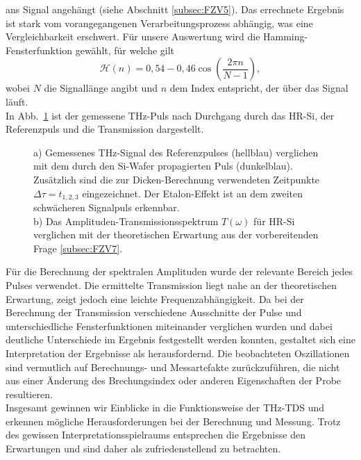 ans Signal angehängt (siehe Abschnitt \ref{subsec:FZV5}). 
Das errechnete Ergebnis ist stark vom vorangegangenen Verarbeitungsprozess abhängig, was eine 
Vergleichbarkeit erschwert. Für unsere Auswertung wird die Hamming-Fensterfunktion gewählt, für 
welche gilt \cite{Wiki}
\begin{equation}
    \mathcal{H}(n) = 0,54-0,46\cos(\frac{2\pi n}{N-1}),
\end{equation}
wobei $N$ die Signallänge angibt und $n$ dem Index entspricht, der über das Signal läuft. \\
In Abb.~\ref{fig:HR} ist der gemessene THz-Puls nach Durchgang durch das HR-Si, der Referenzpuls 
und die Transmission dargestellt.
\begin{figure}[h!]
    \centering
    \qquad
    \caption{\label{fig:HR}a) Gemessenes THz-Signal des Referenzpulses (hellblau) verglichen 
    mit dem durch den Si-Wafer propagierten Puls (dunkelblau). Zusätzlich sind die zur Dicken-Berechnung verwendeten
    Zeitpunkte $\Delta \tau = t_{1,2,3}$ eingezeichnet. Der Etalon-Effekt ist an dem zweiten 
    schwächeren Signalpuls erkennbar. \\
    b) Das Amplituden-Transmissionsspektrum $T(\omega)$ für HR-Si verglichen mit der theoretischen Erwartung 
    aus der vorbereitenden Frage \ref{subsec:FZV7}.}
\end{figure}\FloatBarrier
Für die Berechnung der spektralen Amplituden wurde der relevante Bereich jedes Pulses verwendet. 
Die ermittelte Transmission liegt nahe an der theoretischen Erwartung, zeigt jedoch eine leichte 
Frequenzabhängigkeit. Da bei der Berechnung der Transmission verschiedene Ausschnitte der Pulse 
und unterschiedliche Fensterfunktionen miteinander verglichen wurden und dabei deutliche 
Unterschiede im Ergebnis festgestellt werden konnten, gestaltet sich eine Interpretation der 
Ergebnisse als herausfordernd. Die beobachteten Oszillationen sind vermutlich auf Berechnungs- 
und Messartefakte zurückzuführen, die nicht aus einer Änderung des Brechungsindex oder anderen 
Eigenschaften der Probe resultieren. \\
Insgesamt gewinnen wir Einblicke in die Funktionsweise der THz-TDS und erkennen mögliche 
Herausforderungen bei der Berechnung und Messung. Trotz des gewissen Interpretationsspielraums 
entsprechen die Ergebnisse den Erwartungen und sind daher als zufriedenstellend zu betrachten. \\